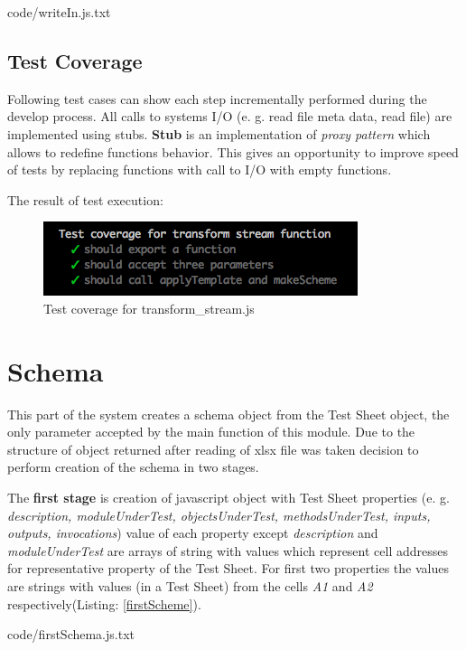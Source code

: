 
{code/writeIn.js.txt}

\subsection{Test Coverage}
Following test cases can show each step incrementally performed during the develop process. All calls to systems I/O (e. g. read file meta data, read file) are implemented using stubs. \textbf{Stub} is an implementation of \textit{proxy pattern} which allows to redefine functions behavior. This gives an opportunity to improve speed of tests by replacing functions with call to I/O with empty functions.
%

The result of test execution:
\begin{figure}[H]
	\centering
	\includegraphics[width=\linewidth]{grafiken/testTransform.png}
	\caption{Test coverage for transform\_stream.js}
	\label{fig:testTransofm}
\end{figure}


\section{Schema}
This part of the system creates a schema object from the Test Sheet object, the only parameter accepted by the main function of this module. Due to the structure of object  returned after reading of xlsx file was taken decision to perform creation of the schema in two stages.

The \textbf{first stage} is creation of javascript object with Test Sheet properties (e. g. \textit{description, moduleUnderTest, objectsUnderTest, methodsUnderTest, inputs, outputs, invocations}) value of each property except \textit{description} and \textit{moduleUnderTest} are arrays of string with values which represent cell addresses for representative property of the Test Sheet. For first two properties the values are strings with values (in a Test Sheet) from the cells \textit{A1} and \textit{A2} respectively(Listing: \ref{firstScheme}).

{code/firstSchema.js.txt}


